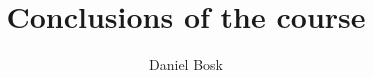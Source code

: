 \title{%
  Conclusions of the course
}
\author{Daniel Bosk}


\mode*

\begin{abstract}
  
\end{abstract}



